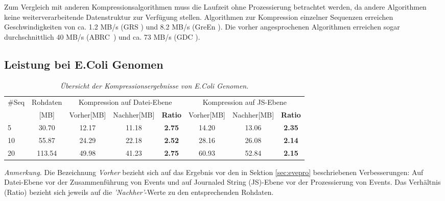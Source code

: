 \documentclass[12pt]{article}
\newenvironment{tightcenter}{%
  \setlength\topsep{0pt}
  \setlength\parskip{0pt}
  \begin{center}
}{%
  \end{center}
}
\begin{document}
Zum Vergleich mit anderen Kompressionsalgorithmen muss die Laufzeit ohne Prozessierung betrachtet werden, da andere Algorithmen keine weiterverarbeitende Datenstruktur zur Verfügung stellen. Algorithmen zur Kompression einzelner Sequenzen erreichen Geschwindigkeiten von ca. 1.2 MB/s (GRS \cite{wang11GRS}) und 8.2 MB/s (GreEn \cite{pinho12Green}). Die vorher angesprochenen Algorithmen erreichen sogar durchschnittlich 40 MB/s (ABRC~\cite{wandelt:ABRC}) und ca. 73 MB/s (GDC \cite{deoriwicz:GDC}).


\subsection{Leistung bei E.Coli Genomen}
\begin{table}[t]
\caption{\label{tab:space_ecoli}\emph{Übersicht der Kompressionsergebnisse von E.Coli Genomen}. }
\small
\begin{tightcenter}
\begin{tabular}{lccccccc}
	\toprule
	$\#$Seq & Rohdaten & \multicolumn{3}{c}{Kompression auf Datei-Ebene} & \multicolumn{3}{c}{Kompression auf JS-Ebene}\\
       & \tiny[MB]  & Vorher\tiny[MB] & Nachher\tiny[MB] & \textbf{Ratio} & Vorher\tiny[MB] & Nachher\tiny[MB] & \textbf{Ratio}\\
	\midrule
	5  & 30.70  & 12.17 & 11.18 & \textbf{2.75} & 14.20 & 13.06 & \textbf{2.35}\\
	10 & 55.87  & 24.29 & 22.18 & \textbf{2.52} & 28.16 & 26.08 & \textbf{2.14}\\
	20 & 113.54 & 49.98 & 41.23 & \textbf{2.75} & 60.93 & 52.84 & \textbf{2.15}\\
	\bottomrule
\end{tabular}
\end{tightcenter}
\begin{tablenotes}
	\small
	\item \emph{Anmerkung.} Die Bezeichnung \textit{Vorher} bezieht sich auf das Ergebnis vor den in Sektion \ref{sec:evepro} beschriebenen Verbesserungen: Auf Datei-Ebene vor der Zusammenführung von Events und auf Journaled String (JS)-Ebene vor der Prozessierung von Events. Das Verhältnis (Ratio) bezieht sich jeweils auf die \textit{'Nachher'}-Werte zu den entsprechenden Rohdaten.
\end{tablenotes}
\end{table}
\end{document}
